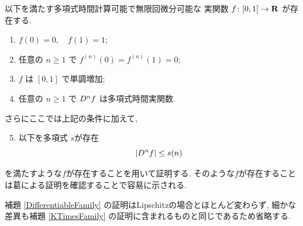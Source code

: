  \begin{lemma}
  \label{SmoothFunction}
  以下を満たす多項式時間計算可能で無限回微分可能な
  実関数 $f \colon [0,1] \to \mathbf R$ が存在する.

  \begin{enumerate}
   \item $f(0) = 0, \quad f(1) = 1$;
   \item 任意の $n \ge 1$ で $f^{(n)}(0) = f^{(n)}(1) = 0$;
   \item $f$ は $[0,1]$ で単調増加;
   \item 任意の $n \ge 1$ で $D^n f$ は多項式時間実関数.
  \end{enumerate}
 \end{lemma}

 さらにここでは上記の条件に加えて, 
 \begin{enumerate}
  \setcounter{enumi}{4} 
  \item 以下を多項式 $s$が存在
	\begin{equation} \label{enum:polynomial-size}
	 |D^n f| \le s(n)
	\end{equation}
 \end{enumerate}
 を満たすような$f$が存在することを用いて証明する.
 そのような$f$が存在することは葛による証明を確認することで容易に示される.

 補題 \ref{DifferentiableFamily} の証明はLipschitzの場合とほとんど変わらず,
 細かな差異も補題 \ref{KTimesFamily} の証明に含まれるものと同じであるため省略する.


